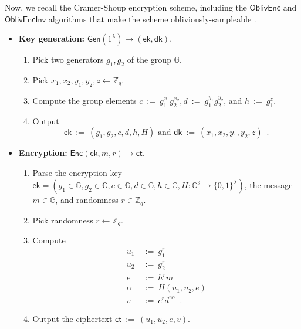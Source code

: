 \documentclass[11pt,letterpaper]{article}
\theoremstyle{plain} %
\theoremstyle{definition} %
\theoremstyle{remark} %
\newcommand{\eqdef}{\ {:=} \ }
\newcommand{\SecParam}{\lambda}
\newcommand{\Gen}{\mathsf{Gen}}
\newcommand{\Enc}{\mathsf{Enc}}
\newcommand{\OblivEnc}{\mathsf{OblivEnc}}
\newcommand{\OblivEncInv}{\mathsf{OblivEncInv}}
\newcommand{\EncKey}{\mathsf{ek}}
\newcommand{\DecKey}{\mathsf{dk}}
\newcommand{\Msg}{m}
\newcommand{\Ct}{\mathsf{ct}}
\newcommand{\Rand}{r}
\newcommand{\Bits}{\{0,1\}}
\newcommand{\Integers}{\mathbb{Z}}
\newcommand{\Group}{\mathbb{G}}
\newcommand{\GrpOrd}{q}
\newcommand{\GrpEltC}{c}
\newcommand{\GrpEltD}{d}
\newcommand{\GrpEltE}{e}
\newcommand{\GrpEltH}{h}
\newcommand{\GrpEltU}{u}
\newcommand{\GrpEltV}{v}
\newcommand{\Generator}{g}
\newcommand{\Hash}{H}
\newcommand{\ExpX}{x}
\newcommand{\ExpY}{y}
\newcommand{\ExpZ}{z}
\newcommand{\Tag}{\alpha}
\begin{document}
Now, we recall the Cramer-Shoup encryption scheme, including the $\OblivEnc$ and $\OblivEncInv$ algorithms that make the scheme obliviously-sampleable \cite{CanettiF01}.
\begin{itemize}
    \item \textbf{Key generation:} $\Gen(1^{\SecParam}) \to (\EncKey, \DecKey)$.
    \begin{enumerate}[nolistsep]
        \item Pick two generators $\Generator_1, \Generator_2$ of the group $\Group$.
        \item Pick $\ExpX_1, \ExpX_2, \ExpY_1, \ExpY_2, \ExpZ \gets \Integers_{\GrpOrd}$.
        \item Compute the group elements $\GrpEltC \eqdef \Generator_1^{\ExpX_1}\Generator_2^{\ExpX_2}, \GrpEltD \eqdef \Generator_1^{\ExpY_1}\Generator_2^{\ExpY_2}$, and $\GrpEltH \eqdef \Generator_1^{\ExpZ}$.
        \item Output
        \begin{equation*}
            \EncKey \eqdef (\Generator_1, \Generator_2, \GrpEltC, \GrpEltD, \GrpEltH, \Hash)
            \textrm{ and }
            \DecKey \eqdef (\ExpX_1, \ExpX_2, \ExpY_1, \ExpY_2, \ExpZ)
            \enspace.
        \end{equation*}
    \end{enumerate}

    \item \textbf{Encryption:} $\Enc(\EncKey, \Msg, \Rand) \to \Ct$.
    \begin{enumerate}[nolistsep]
        \item Parse the encryption key $\EncKey = (\Generator_1 \in \Group, \Generator_2 \in \Group, \GrpEltC\in \Group, \GrpEltD\in \Group, \GrpEltH\in \Group, \Hash \colon \Group^{3} \to \Bits^{\SecParam})$, the message $\Msg \in \Group$, and randomness $\Rand \in \Integers_{\GrpOrd}$.
        \item Pick randomness $\Rand \gets \Integers_{\GrpOrd}$.
        \item Compute
        \begin{align*}
            \GrpEltU_1 &\eqdef \Generator_1^{\Rand}\\
            \GrpEltU_2 &\eqdef \Generator_2^{\Rand}\\
            \GrpEltE &\eqdef \GrpEltH^{\Rand}\Msg\\
            \Tag &\eqdef \Hash(\GrpEltU_1, \GrpEltU_2, \GrpEltE)\\
            \GrpEltV &\eqdef \GrpEltC^{\Rand}\GrpEltD^{\Rand\Tag}
            \enspace.
        \end{align*}
        \item Output the ciphertext $\Ct \eqdef (\GrpEltU_1, \GrpEltU_2, \GrpEltE, \GrpEltV)$.
    \end{enumerate}


\end{itemize}
\end{document}
